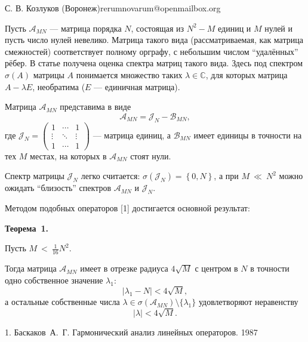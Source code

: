 \documentclass{article}
\begin{document}
{С. В. Козлуков}
{}{ (Воронеж)}{rerumnovarum@openmailbox.org}

Пусть \( \mathcal{A}_{MN} \) --- матрица порядка \( N \),
состоящая из \( N^2 - M \) единиц и \( M \) нулей
и пусть число нулей невелико.
Матрица такого вида (рассматриваемая, как матрица смежностей) соответствует
полному орграфу, с небольшим числом ``удалённых'' рёбер.
В статье получена оценка спектра
матриц такого вида.
Здесь под спектром \( \sigma\left({A}\right) \) матрицы \( A \)
понимается множество таких \( \lambda\in\mathbb{C} \), для которых
матрица \( A - \lambda E \), необратима (\( E \) --- единичная матрица).

Матрица \( \mathcal{A}_{MN} \) представима в виде
\[
    \mathcal{A}_{MN} = \mathcal{J}_{N} - \mathcal{B}_{MN},
    \]
где \(
\mathcal{J}_{N} =
\begin{pmatrix}1 & \cdots & 1 \\
\vdots & \ddots & \vdots \\
1 & \cdots & 1
\end{pmatrix} \) --- матрица единиц,
а \( \mathcal{B}_{MN} \) имеет единицы в точности на тех \( M \)
местах, на которых в \( \mathcal{A}_{MN} \) стоят нули.

Спектр матрицы \( \mathcal{J}_{N} \) легко считается:
\( \sigma\left({\mathcal{J}_{N}}\right) = \left\{0, N \right\} \),
а при \( M~\ll~N^2 \) можно ожидать ``близость'' спектров
\( \mathcal{A}_{MN} \) и \( \mathcal{J}_{N} \).

Методом подобных операторов [1]
достигается основной результат:

\textbf{Теорема~1.}
\begin{center}\relax
    Пусть
    \(M~<~\displaystyle{\frac{1}{16}N^2}. \)

Тогда матрица \( \mathcal{A}_{MN} \) имеет в отрезке
    радиуса \( 4\sqrt{M} \) с центром в \( N \)
    в точности одно собственное значение \( \lambda_1 \):
    \[ \lvert \lambda_1 - N \rvert < 4\sqrt{M}, \]
    а остальные собственные числа
    \( \lambda\in\sigma\left({\mathcal{A}_{MN}}\right)\setminus\{\lambda_1\} \)
    удовлетворяют неравенству
    \[ \lvert \lambda \rvert < 4\sqrt{M}. \]
\end{center}

\liter

1. Баскаков~А.~Г. Гармонический анализ линейных операторов. 1987
\end{document}

